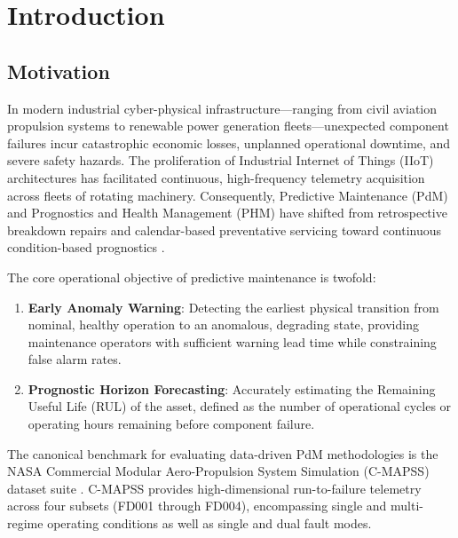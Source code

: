 \section{Introduction}
\label{sec:introduction}

\subsection{Motivation}
In modern industrial cyber-physical infrastructure---ranging from civil aviation propulsion systems to renewable power generation fleets---unexpected component failures incur catastrophic economic losses, unplanned operational downtime, and severe safety hazards. The proliferation of Industrial Internet of Things (IIoT) architectures has facilitated continuous, high-frequency telemetry acquisition across fleets of rotating machinery. Consequently, Predictive Maintenance (PdM) and Prognostics and Health Management (PHM) have shifted from retrospective breakdown repairs and calendar-based preventative servicing toward continuous condition-based prognostics \cite{saxena2008damage, ramasso2014performance}.

The core operational objective of predictive maintenance is twofold:
\begin{enumerate}
    \item \textbf{Early Anomaly Warning}: Detecting the earliest physical transition from nominal, healthy operation to an anomalous, degrading state, providing maintenance operators with sufficient warning lead time while constraining false alarm rates.
    \item \textbf{Prognostic Horizon Forecasting}: Accurately estimating the Remaining Useful Life (RUL) of the asset, defined as the number of operational cycles or operating hours remaining before component failure.
\end{enumerate}

The canonical benchmark for evaluating data-driven PdM methodologies is the NASA Commercial Modular Aero-Propulsion System Simulation (C-MAPSS) dataset suite \cite{saxena2008damage}. C-MAPSS provides high-dimensional run-to-failure telemetry across four subsets (FD001 through FD004), encompassing single and multi-regime operating conditions as well as single and dual fault modes.

